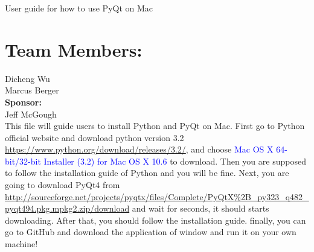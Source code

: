 \documentclass[11pt]{book}
\begin{document}
\fontsize{16}{16}\selectfont User guide for how to use PyQt on Mac

\section{Team Members:}
Dicheng Wu
\\Marcus Berger\\
\textbf{Sponsor:}
\\Jeff McGough
\\

This file will guide users to install Python and PyQt on Mac. First go to Python official website and download python version 3.2 \url{https://www.python.org/download/releases/3.2/}, and choose \textcolor{blue} {Mac OS X 64-bit/32-bit Installer (3.2) for Mac OS X 10.6 } to download. Then you are supposed to follow the installation guide of Python and you will be fine. Next, you are going to download PyQt4 from \url {http://sourceforge.net/projects/pyqtx/files/Complete/PyQtX%2B_py323_q482_pyqt494.pkg.mpkg2.zip/download} and wait for seconds, it should starts downloading. After that, you should follow the installation guide. finally, you can go to GitHub and download the application of window and run it on your own machine!
\end{document}
